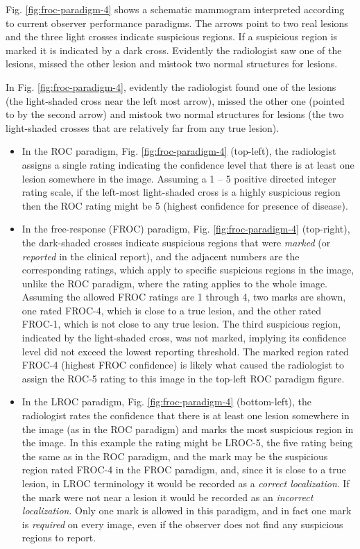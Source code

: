 \documentclass[
]{book}
\begin{document}
Fig. \ref{fig:froc-paradigm-4} shows a schematic mammogram interpreted according to current observer performance paradigms. The arrows point to two real lesions and the three light crosses indicate suspicious regions. If a suspicious region is marked it is indicated by a dark cross. Evidently the radiologist saw one of the lesions, missed the other lesion and mistook two normal structures for lesions.

In Fig. \ref{fig:froc-paradigm-4}, evidently the radiologist found one of the lesions (the light-shaded cross near the left most arrow), missed the other one (pointed to by the second arrow) and mistook two normal structures for lesions (the two light-shaded crosses that are relatively far from any true lesion).

\begin{itemize}
\item
  In the ROC paradigm, Fig. \ref{fig:froc-paradigm-4} (top-left), the radiologist assigns a single rating indicating the confidence level that there is at least one lesion somewhere in the image. Assuming a 1 -- 5 positive directed integer rating scale, if the left-most light-shaded cross is a highly suspicious region then the ROC rating might be 5 (highest confidence for presence of disease).
\item
  In the free-response (FROC) paradigm, Fig. \ref{fig:froc-paradigm-4} (top-right), the dark-shaded crosses indicate suspicious regions that were \emph{marked} (or \emph{reported} in the clinical report), and the adjacent numbers are the corresponding ratings, which apply to specific suspicious regions in the image, unlike the ROC paradigm, where the rating applies to the whole image. Assuming the allowed FROC ratings are 1 through 4, two marks are shown, one rated FROC-4, which is close to a true lesion, and the other rated FROC-1, which is not close to any true lesion. The third suspicious region, indicated by the light-shaded cross, was not marked, implying its confidence level did not exceed the lowest reporting threshold. The marked region rated FROC-4 (highest FROC confidence) is likely what caused the radiologist to assign the ROC-5 rating to this image in the top-left ROC paradigm figure.
\item
  In the LROC paradigm, Fig. \ref{fig:froc-paradigm-4} (bottom-left), the radiologist rates the confidence that there is at least one lesion somewhere in the image (as in the ROC paradigm) and marks the most suspicious region in the image. In this example the rating might be LROC-5, the five rating being the same as in the ROC paradigm, and the mark may be the suspicious region rated FROC-4 in the FROC paradigm, and, since it is close to a true lesion, in LROC terminology it would be recorded as a \emph{correct localization}. If the mark were not near a lesion it would be recorded as an \emph{incorrect localization}. Only one mark is allowed in this paradigm, and in fact one mark is \emph{required} on every image, even if the observer does not find any suspicious regions to report.

\end{itemize}
\end{document}
